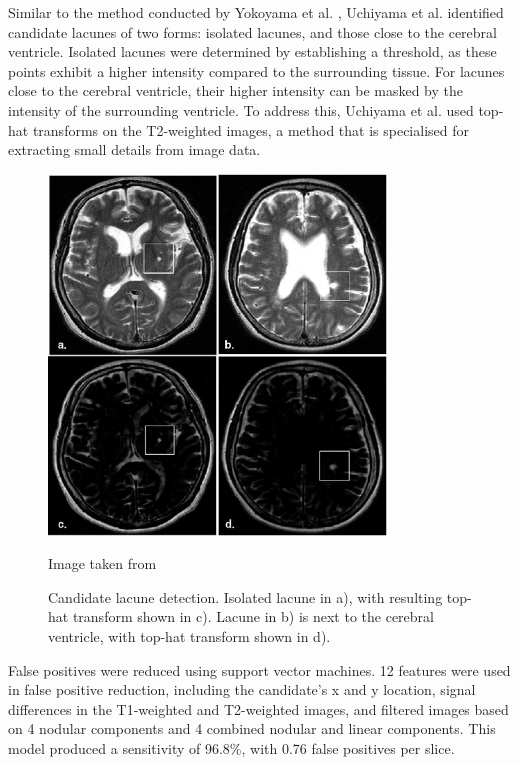 Similar to the method conducted by Yokoyama et al. \cite{Yokoyama2007}, Uchiyama et al. identified candidate lacunes of two forms: isolated lacunes, and those close to the cerebral ventricle. Isolated lacunes were determined by establishing a threshold, as these points exhibit a higher intensity compared to the surrounding tissue. For lacunes close to the cerebral ventricle, their higher intensity can be masked by the intensity of the surrounding ventricle. To address this, Uchiyama et al. used top-hat transforms on the T2-weighted images, a method that is specialised for extracting small details from image data.

\begin{figure}[ht]
	\centering
	\includegraphics[width=0.8\textwidth]{Images/4_uchiyama_candidates.png}
	\caption{Candidate lacune detection. Isolated lacune in a), with resulting top-hat transform shown in c). Lacune in b) is next to the cerebral ventricle, with top-hat transform shown in d).}
	\small Image taken from \cite{Uchiyama20071554}
\end{figure}

False positives were reduced using support vector machines. 12 features were used in false positive reduction, including the candidate's x and y location, signal differences in the T1-weighted and T2-weighted images, and filtered images based on 4 nodular components and 4 combined nodular and linear components. This model produced a sensitivity of 96.8\%, with 0.76 false positives per slice.


